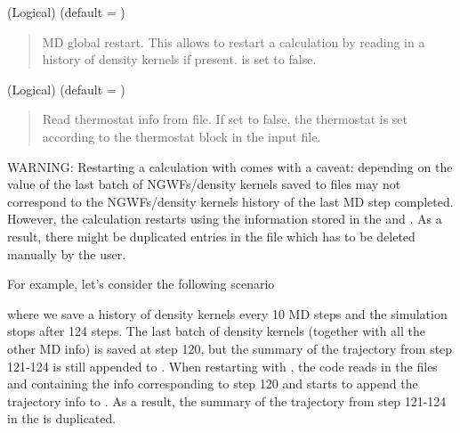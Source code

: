 \documentclass[letterpaper,10pt,english]{sphinxmanual}
\begin{document}
 (Logical) (default = )
\begin{quote}

\begin{DUlineblock}{0em}
\item[] MD global restart. This allows to restart a calculation by reading in a history of density kernels if present.  is set to false.
\end{DUlineblock}
\end{quote}

 (Logical) (default = )
\begin{quote}

\begin{DUlineblock}{0em}
\item[] Read thermostat info from file. If set to false, the thermostat is set according to the thermostat block in the input file.
\end{DUlineblock}
\end{quote}

WARNING: Restarting a calculation with  comes
with a caveat: depending on the value of  the last
batch of NGWFs/density kernels saved to files may not correspond to the
NGWFs/density kernels history of the last MD step completed. However,
the calculation restarts using the information stored in the
 and . As a result,
there might be duplicated entries in the  file which has
to be deleted manually by the user.

For example, let’s consider the following scenario

%
\begin{sphinxVerbatim}[commandchars=\\\{\}]
       
  
\end{sphinxVerbatim}

where we save a history of density kernels every 10 MD steps and the
simulation stops after 124 steps. The last batch of density kernels
(together with all the other MD info) is saved at step 120, but the
summary of the trajectory from step 121-124 is still appended to
. When restarting with , the
code reads in the files  and
 containing the info corresponding to step 120
and starts to append the trajectory info to . As a
result, the summary of the trajectory from step 121-124 in the
 is duplicated.
\end{document}
